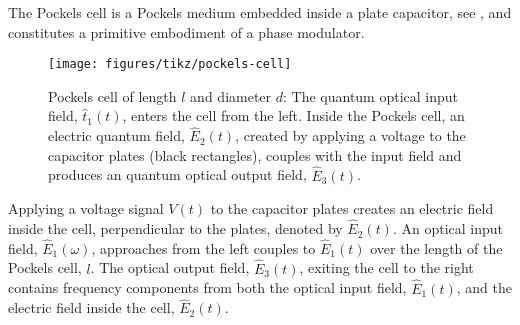 The Pockels cell is a Pockels medium embedded inside a plate capacitor, see , and constitutes a primitive embodiment of a phase modulator.
\begin{figure}[htb]
    \centering
    \texttt{[image: figures/tikz/pockels-cell]}
    \caption{Pockels cell of length $l$ and diameter $d$: The quantum optical input field, $\hat{t}_1(t)$, enters the cell from the left. Inside the Pockels cell, an electric quantum field, $\hat{E}_2(t)$, created by applying a voltage to the capacitor plates (black rectangles), couples with the input field and produces an quantum optical output field, $\hat{E}_3(t)$.}\label{fig:pockels_cell}
\end{figure}
Applying a voltage signal $V(t)$ to the capacitor plates creates an electric field inside the cell, perpendicular to the plates, denoted by $\hat{E}_2(t)$.
An optical input field, $\hat{E}_1(\omega)$, approaches from the left couples to $\hat{E}_1(t)$ over the length of the Pockels cell, $l$.
The optical output field, $\hat{E}_3(t)$, exiting the cell to the right contains frequency components from both the optical input field, $\hat{E}_1(t)$, and the electric field inside the cell, $\hat{E}_2(t)$.


